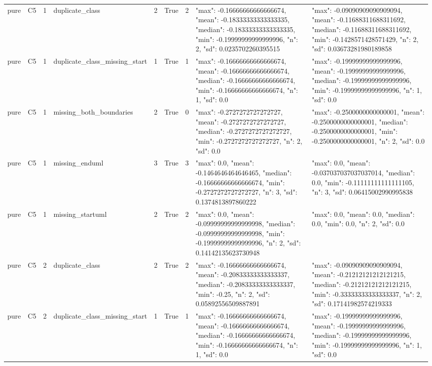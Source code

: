 \begin{tabular}{lllllllll}
pure & C5 & 1 & duplicate\_class & 2 & True & 2 & {"max": -0.16666666666666674, "mean": -0.18333333333333335, "median": -0.18333333333333335, "min": -0.19999999999999996, "n": 2, "sd": 0.0235702260395515} & {"max": -0.09090909090909094, "mean": -0.11688311688311692, "median": -0.11688311688311692, "min": -0.1428571428571429, "n": 2, "sd": 0.03673281980189858} \\
pure & C5 & 1 & duplicate\_class\_missing\_start & 1 & True & 1 & {"max": -0.16666666666666674, "mean": -0.16666666666666674, "median": -0.16666666666666674, "min": -0.16666666666666674, "n": 1, "sd": 0.0} & {"max": -0.19999999999999996, "mean": -0.19999999999999996, "median": -0.19999999999999996, "min": -0.19999999999999996, "n": 1, "sd": 0.0} \\
pure & C5 & 1 & missing\_both\_boundaries & 2 & True & 0 & {"max": -0.2727272727272727, "mean": -0.2727272727272727, "median": -0.2727272727272727, "min": -0.2727272727272727, "n": 2, "sd": 0.0} & {"max": -0.2500000000000001, "mean": -0.2500000000000001, "median": -0.2500000000000001, "min": -0.2500000000000001, "n": 2, "sd": 0.0} \\
pure & C5 & 1 & missing\_enduml & 3 & True & 3 & {"max": 0.0, "mean": -0.1464646464646465, "median": -0.16666666666666674, "min": -0.2727272727272727, "n": 3, "sd": 0.1374813897860222} & {"max": 0.0, "mean": -0.037037037037037014, "median": 0.0, "min": -0.11111111111111105, "n": 3, "sd": 0.06415002990995838} \\
pure & C5 & 1 & missing\_startuml & 2 & True & 2 & {"max": 0.0, "mean": -0.09999999999999998, "median": -0.09999999999999998, "min": -0.19999999999999996, "n": 2, "sd": 0.14142135623730948} & {"max": 0.0, "mean": 0.0, "median": 0.0, "min": 0.0, "n": 2, "sd": 0.0} \\
pure & C5 & 2 & duplicate\_class & 2 & True & 2 & {"max": -0.16666666666666674, "mean": -0.20833333333333337, "median": -0.20833333333333337, "min": -0.25, "n": 2, "sd": 0.05892556509887891} & {"max": -0.09090909090909094, "mean": -0.21212121212121215, "median": -0.21212121212121215, "min": -0.33333333333333337, "n": 2, "sd": 0.17141982574219333} \\
pure & C5 & 2 & duplicate\_class\_missing\_start & 1 & True & 1 & {"max": -0.16666666666666674, "mean": -0.16666666666666674, "median": -0.16666666666666674, "min": -0.16666666666666674, "n": 1, "sd": 0.0} & {"max": -0.19999999999999996, "mean": -0.19999999999999996, "median": -0.19999999999999996, "min": -0.19999999999999996, "n": 1, "sd": 0.0} \\

\end{tabular}
